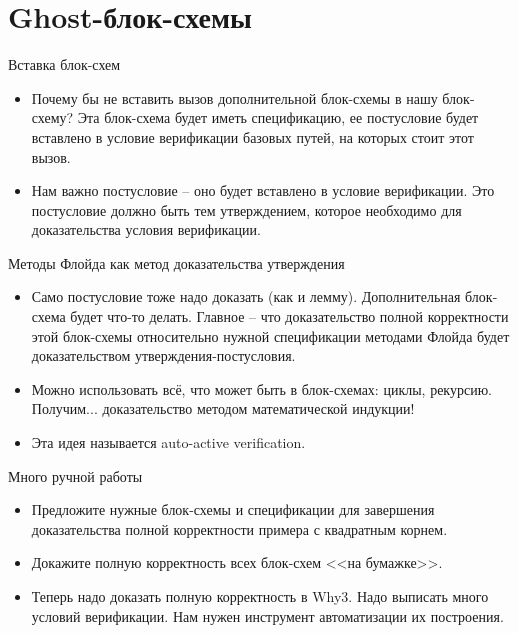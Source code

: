 \documentclass[hyperref={unicode=true}]{beamer}
\begin{document}
    \section{Ghost-блок-схемы}

    \begin{frame}{Вставка блок-схем}
    \begin{itemize}
    \item
    Почему бы не вставить вызов дополнительной блок-схемы
    в нашу блок-схему? Эта блок-схема будет иметь спецификацию,
    ее постусловие будет вставлено в условие верификации
    базовых путей, на которых стоит этот вызов.
    \item
    Нам важно постусловие -- оно будет вставлено в условие
    верификации. Это постусловие должно быть тем утверждением,
    которое необходимо для доказательства условия верификации.
    \end{itemize}
    \end{frame}

    \begin{frame}{Методы Флойда как метод доказательства утверждения}
    \begin{itemize}
    \item
    Само постусловие тоже надо доказать (как и лемму).
    Дополнительная блок-схема будет что-то делать. Главное --
    что доказательство полной корректности этой блок-схемы
    относительно нужной спецификации методами Флойда
    будет доказательством утверждения-постусловия.
    \item
    Можно использовать всё, что может быть в блок-схемах:
    циклы, рекурсию. Получим... доказательство методом
    математической индукции!
    \item
    Эта идея называется auto-active verification.
    \end{itemize}
    \end{frame}

    \begin{frame}{Много ручной работы}
    \begin{itemize}
    \item
    Предложите нужные блок-схемы и спецификации для
    завершения доказательства полной корректности
    примера с квадратным корнем.
    \item
    Докажите полную корректность всех блок-схем
    <<на бумажке>>.
    \item
    Теперь надо доказать полную корректность в Why3.
    Надо выписать много условий верификации. Нам нужен
    инструмент автоматизации их построения.
    \end{itemize}
    \end{frame}
\end{document}
